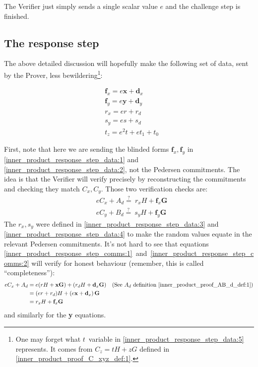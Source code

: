 \documentclass[10pt,a4paper]{article}
\begin{document}
The Verifier just simply sends a single scalar value $e$ and the challenge step is finished.

\hypertarget{the-response-step}{%
\subsection[The response
step]{\texorpdfstring{\protect\hypertarget{anchor-38}{}{}The response
step}{The response step}}\label{the-response-step}}

The above detailed discussion will hopefully make the following set of
data, sent by the Prover, less bewildering\footnote{One may forget what $t$~variable 
in \eqref{inner_product_response_step_data:5} represents. 
It comes from $C_z = tH + zG$ defined in \eqref{inner_product_proof_C_xyz_def:1}.}:

\begin{align}
& \mathbf{f}_x = e\mathbf{x} + \mathbf{d}_x \label{inner_product_response_step_data:1} \\
& \mathbf{f}_y = e\mathbf{y} + \mathbf{d}_y \label{inner_product_response_step_data:2} \\
& r_x = er + r_d \label{inner_product_response_step_data:3} \\
& s_y = es + s_d \label{inner_product_response_step_data:4} \\
& t_z = e^2 t + et_1 + t_0 \label{inner_product_response_step_data:5}
\end{align}

First, note that here we are sending the blinded forms $\mathbf{f}_x, \mathbf{f}_y$ in 
\eqref{inner_product_response_step_data:1} and \eqref{inner_product_response_step_data:2}, 
not the Pedersen commitments. The idea is that the Verifier
will verify precisely by reconstructing the commitments and checking
they match $C_x, C_y$. Those two verification checks are:
\begin{align}
& eC_x + A_d \stackrel{?}{=} \ r_x H + \mathbf{f}_x \mathbf{G} \label{inner_product_response_step_comms:1} \\
& eC_y + B_d \stackrel{?}{=} \ s_y H + \mathbf{f}_y \mathbf{G} \label{inner_product_response_step_comms:2}
\end{align}
The $r_x, s_y$ were defined in \eqref{inner_product_response_step_data:3} and 
\eqref{inner_product_response_step_data:4} to make the random values equate 
in the relevant Pedersen commitments. It's not hard to see that equations 
\eqref{inner_product_response_step_comms:1}~and~\eqref{inner_product_response_step_comms:2} will
verify for honest behaviour (remember, this is called ``completeness''):
\begin{align}
eC_x + A_d & = e(rH + \mathbf{xG}) + (r_d H + \mathbf{d}_x \mathbf{G}) \quad\text{(See $A_d$ definition \eqref{inner_product_proof_AB_d_def:1})}\\
           & = (er + r_d) H + \left(e\mathbf{x} + \mathbf{d}_x\right)\mathbf{G}  \\
           & = r_x H + \mathbf{f}_x \mathbf{G}
\end{align}
and similarly for the \textbf{y} equations.
\end{document}
